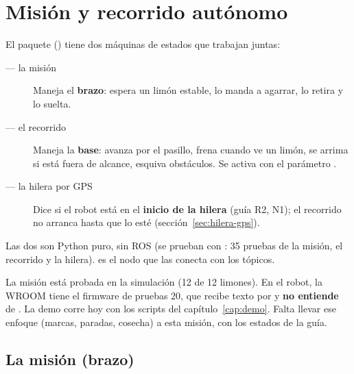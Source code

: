 \chapter{Misión y recorrido autónomo}\label{cap:mision}

El paquete  () tiene dos máquinas de estados que trabajan juntas:

\begin{description}
  \item[ — la misión] Maneja el \textbf{brazo}: espera un limón estable, lo manda a agarrar, lo retira y
        lo suelta.
  \item[ — el recorrido] Maneja la \textbf{base}: avanza por el pasillo, frena cuando ve un limón,
        se arrima si está fuera de alcance, esquiva obstáculos. Se activa con el parámetro .
  \item[ — la hilera por GPS] Dice si el robot está en el \textbf{inicio de la hilera} (guía R2,
        N1); el recorrido no arranca hasta que lo esté (sección~\ref{sec:hilera-gps}).
\end{description}

Las dos son Python puro, sin ROS (se prueban con : 35 pruebas de la misión, el recorrido y la hilera). 
es el nodo que las conecta con los tópicos.

\begin{pendiente}
La misión está probada en la simulación (12 de 12 limones). En el robot, la WROOM tiene el firmware de pruebas 20, que
recibe texto por  y \textbf{no entiende}  de . La demo
corre hoy con los scripts del capítulo~\ref{cap:demo}. Falta llevar ese enfoque (marcas, paradas, cosecha) a esta
misión, con los estados de la guía.
\end{pendiente}

\section{La misión (brazo)}

